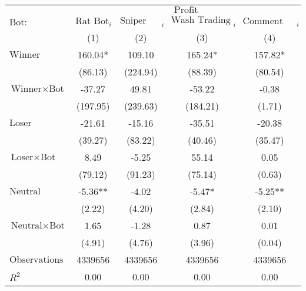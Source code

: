 \begin{tabular}{lcccc}
\hline
 & \multicolumn{4}{c}{$\text{Profit}$} \\
 $\text{Bot}:$ & $\text{Rat Bot}_{i}$ & $\text{Sniper Bot}_{i}$ & $\text{Wash Trading Bot}_{i}$ & $\text{Comment Bot}_{i}$ \\
 & (1) & (2) & (3) & (4)\\
\hline
$\text{Winner}$ & 160.04* & 109.10 & 165.24* & 157.82* \\
 & (86.13) & (224.94) & (88.39) & (80.54) \\
$\text{Winner} \times \text{Bot}$ & -37.27 & 49.81 & -53.22 & -0.38 \\
 & (197.95) & (239.63) & (184.21) & (1.71) \\
$\text{Loser}$ & -21.61 & -15.16 & -35.51 & -20.38 \\
 & (39.27) & (83.22) & (40.46) & (35.47) \\
$\text{Loser} \times \text{Bot}$ & 8.49 & -5.25 & 55.14 & 0.05 \\
 & (79.12) & (91.23) & (75.14) & (0.63) \\
$\text{Neutral}$ & -5.36** & -4.02 & -5.47* & -5.25** \\
 & (2.22) & (4.20) & (2.84) & (2.10) \\
$\text{Neutral} \times \text{Bot}$ & 1.65 & -1.28 & 0.87 & 0.01 \\
 & (4.91) & (4.76) & (3.96) & (0.04) \\
$\text{Observations}$ & 4339656 & 4339656 & 4339656 & 4339656 \\
$R^2$ & 0.00 & 0.00 & 0.00 & 0.00 \\
\hline
\end{tabular}